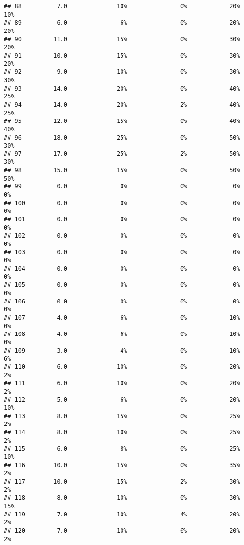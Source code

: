 \documentclass[
]{article}
\begin{document}
\begin{verbatim}
## 88          7.0              10%               0%            20%         10%
## 89          6.0               6%               0%            20%         20%
## 90         11.0              15%               0%            30%         20%
## 91         10.0              15%               0%            30%         20%
## 92          9.0              10%               0%            30%         30%
## 93         14.0              20%               0%            40%         25%
## 94         14.0              20%               2%            40%         25%
## 95         12.0              15%               0%            40%         40%
## 96         18.0              25%               0%            50%         30%
## 97         17.0              25%               2%            50%         30%
## 98         15.0              15%               0%            50%         50%
## 99          0.0               0%               0%             0%          0%
## 100         0.0               0%               0%             0%          0%
## 101         0.0               0%               0%             0%          0%
## 102         0.0               0%               0%             0%          0%
## 103         0.0               0%               0%             0%          0%
## 104         0.0               0%               0%             0%          0%
## 105         0.0               0%               0%             0%          0%
## 106         0.0               0%               0%             0%          0%
## 107         4.0               6%               0%            10%          0%
## 108         4.0               6%               0%            10%          0%
## 109         3.0               4%               0%            10%          6%
## 110         6.0              10%               0%            20%          2%
## 111         6.0              10%               0%            20%          2%
## 112         5.0               6%               0%            20%         10%
## 113         8.0              15%               0%            25%          2%
## 114         8.0              10%               0%            25%          2%
## 115         6.0               8%               0%            25%         10%
## 116        10.0              15%               0%            35%          2%
## 117        10.0              15%               2%            30%          2%
## 118         8.0              10%               0%            30%         15%
## 119         7.0              10%               4%            20%          2%
## 120         7.0              10%               6%            20%          2%

\end{verbatim}
\end{document}
